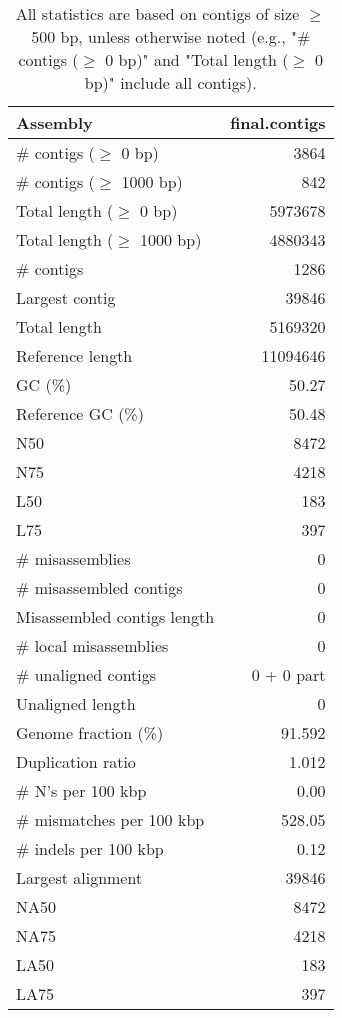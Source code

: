 \documentclass[12pt,a4paper]{article}
\begin{document}
\begin{table}[ht]
\begin{center}
\caption{All statistics are based on contigs of size $\geq$ 500 bp, unless otherwise noted (e.g., "\# contigs ($\geq$ 0 bp)" and "Total length ($\geq$ 0 bp)" include all contigs).}
\begin{tabular}{|l*{1}{|r}|}
\hline
Assembly & final.contigs \\ \hline
\# contigs ($\geq$ 0 bp) & 3864 \\ \hline
\# contigs ($\geq$ 1000 bp) & 842 \\ \hline
Total length ($\geq$ 0 bp) & 5973678 \\ \hline
Total length ($\geq$ 1000 bp) & 4880343 \\ \hline
\# contigs & 1286 \\ \hline
Largest contig & 39846 \\ \hline
Total length & 5169320 \\ \hline
Reference length & 11094646 \\ \hline
GC (\%) & 50.27 \\ \hline
Reference GC (\%) & 50.48 \\ \hline
N50 & 8472 \\ \hline
N75 & 4218 \\ \hline
L50 & 183 \\ \hline
L75 & 397 \\ \hline
\# misassemblies & 0 \\ \hline
\# misassembled contigs & 0 \\ \hline
Misassembled contigs length & 0 \\ \hline
\# local misassemblies & 0 \\ \hline
\# unaligned contigs & 0 + 0 part \\ \hline
Unaligned length & 0 \\ \hline
Genome fraction (\%) & 91.592 \\ \hline
Duplication ratio & 1.012 \\ \hline
\# N's per 100 kbp & 0.00 \\ \hline
\# mismatches per 100 kbp & 528.05 \\ \hline
\# indels per 100 kbp & 0.12 \\ \hline
Largest alignment & 39846 \\ \hline
NA50 & 8472 \\ \hline
NA75 & 4218 \\ \hline
LA50 & 183 \\ \hline
LA75 & 397 \\ \hline
\end{tabular}
\end{center}
\end{table}
\end{document}
